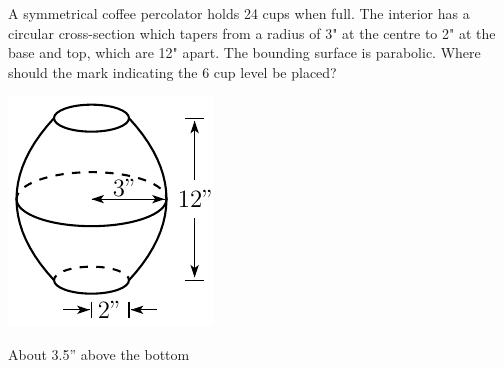 \begin{question}
A symmetrical coffee percolator holds 24 cups when full. The interior has a circular cross-section which tapers from a radius of 3" at the centre to 2" at the base and top, which are 12" apart. The bounding surface is parabolic. Where should the mark indicating the 6 cup level be placed?

\begin{center}
     \includegraphics[scale=1.0]{fig/coffee.pdf}
\end{center}
\end{question}

%

\begin{answer}
About 3.5'' above the bottom
\end{answer}

